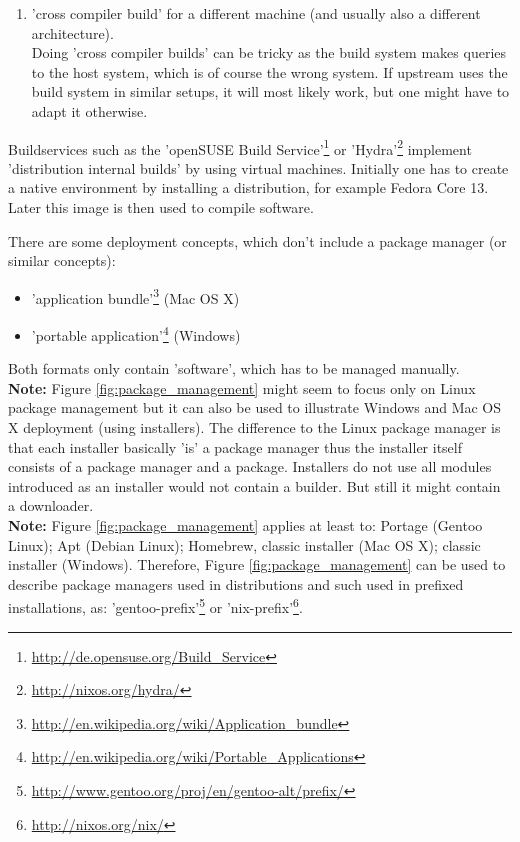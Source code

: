 \documentclass[a4paper,10pt]{article}
\begin{document}
\begin{enumerate}
\begin{itemize}
\begin{enumerate}
\begin{enumerate}
 \item 'cross compiler build' for a different machine (and usually also a different architecture).\\
Doing 'cross compiler builds' can be tricky as the build system makes queries to the host system, which is of course the wrong system. If upstream uses the build system in similar setups, it will most likely work, but one might have to adapt it otherwise.

\end{enumerate}

\end{enumerate}
Buildservices such as the 'openSUSE Build Service'\footnote{\url{http://de.opensuse.org/Build_Service}} or 'Hydra'\footnote{\url{http://nixos.org/hydra/}} implement 'distribution internal builds' by using virtual machines. Initially one has to create a native environment by installing a distribution, for example Fedora Core 13. Later this image is then used to compile software.
\end{itemize}

\end{enumerate}

There are some deployment concepts, which don't include a package manager (or similar concepts):
\begin{itemize}
 \item 'application bundle'\footnote{\url{http://en.wikipedia.org/wiki/Application\_bundle}} (Mac OS X)
 \item 'portable application'\footnote{\url{http://en.wikipedia.org/wiki/Portable\_Applications}} (Windows)
\end{itemize}
Both formats only contain 'software', which has to be managed manually.\\

\textbf{Note:} Figure \ref{fig:package_management} might seem to focus only on Linux package management but it can also be used to illustrate Windows and Mac OS X deployment (using installers). The difference to the Linux package manager is that each installer basically 'is' a package manager thus the installer itself consists of a package manager and a package. Installers do not use all modules introduced as an installer would not contain a builder. But still it might contain a downloader.\\

\textbf{Note:} Figure \ref{fig:package_management} applies at least to: Portage (Gentoo Linux); Apt (Debian Linux); Homebrew, classic installer (Mac OS X); classic installer (Windows). Therefore, Figure \ref{fig:package_management} can be used to describe package managers used in distributions and such used in prefixed installations, as: 'gentoo-prefix'\footnote{\url{http://www.gentoo.org/proj/en/gentoo-alt/prefix/}} or 'nix-prefix'\footnote{\url{http://nixos.org/nix/}}.
\end{document}
